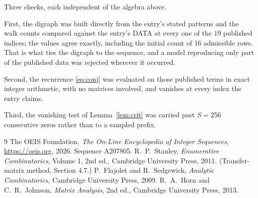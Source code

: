 \documentclass[11pt,a4paper]{article}
\theoremstyle{plain}
\theoremstyle{definition}
\begin{document}
Three checks, each independent of the algebra above.

First, the digraph was built directly from the entry's stated patterns and the walk counts
compared against the entry's DATA at every one of the $19$ published indices; the
values agree exactly, including the initial count of $16$ admissible rows. That is
what ties the digraph to the sequence, and a model reproducing only part of the published
data was rejected wherever it occurred.

Second, the recurrence \eqref{eq:conj} was evaluated on those published terms in exact
integer arithmetic, with no matrices involved, and vanishes at every index the entry claims.

Third, the vanishing test of Lemma~\ref{lem:crit} was carried past $S=256$ consecutive
zeros rather than to a sampled prefix.

\begin{thebibliography}{9}
 The OEIS Foundation, \emph{The On-Line Encyclopedia of Integer
Sequences}, \url{https://oeis.org}, 2026. Sequence A207805.
 R.~P.~Stanley, \emph{Enumerative Combinatorics}, Volume 1, 2nd ed.,
Cambridge University Press, 2011. (Transfer-matrix method, Section 4.7.)
 P.~Flajolet and R.~Sedgewick, \emph{Analytic Combinatorics}, Cambridge
University Press, 2009.
 R.~A.~Horn and C.~R.~Johnson, \emph{Matrix Analysis}, 2nd ed., Cambridge
University Press, 2013.
\end{thebibliography}
\end{document}
